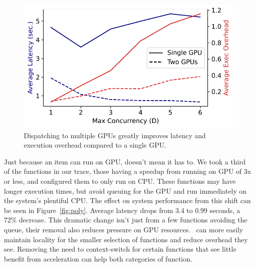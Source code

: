 
\begin{figure}
  \centering
  \includegraphics{mqfq/graphs/multi-gpu/25.7/concurr_scale.pdf}
  \caption{Dispatching to multiple GPUs greatly improves latency and execution overhead compared to a single GPU.
  }
  \label{fig:multi-gpu}
\end{figure}


Just because an item can run on GPU, doesn't mean it has to.
We took a third of the functions in our trace, those having a speedup from running on GPU of 3x or less, and configured them to only run on CPU.
These functions may have longer execution times, but avoid queuing for the GPU and run immediately on the system's plentiful CPU.
The effect on system performance from this shift can be seen in Figure~\ref{fig:poly}.
Average latency drops from 3.4 to 0.99 seconds, a 72\% decrease.
This dramatic change isn't just from a few functions avoiding the queue, their removal also reduces pressure on GPU resources.
\QName~can more easily maintain locality for the smaller selection of functions and reduce overhead they see.
Removing the need to context-switch for certain functions that see little benefit from acceleration can help both categories of function.

